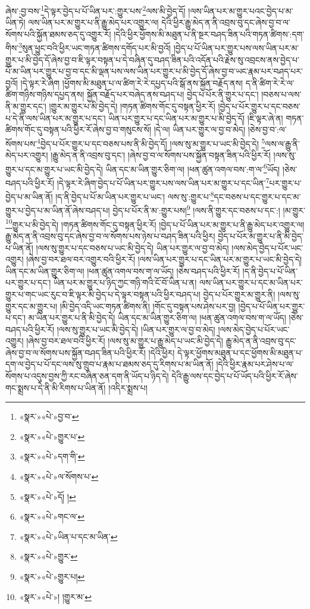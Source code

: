 ཞེས་:བྱ་བས་\footnote{«སྣར་»«པེ་»བྱ་བ་}དེ་ལྟར་བྱེད་པ་པོ་ཡིན་པར་:གྱུར་པས་\footnote{«སྣར་»«པེ་»གྱུར་པ་}ལས་མི་བྱེད་དོ། །ལས་ཡིན་པར་མ་གྱུར་པའང་བྱེད་པ་མ་ཡིན་ཏེ། ལས་ཡིན་པར་མ་གྱུར་པ་ནི་རྒྱུ་མེད་པར་འགྱུར་ལ། དེའི་ཕྱིར་རྒྱུ་མེད་ན་ནི་འབྲས་བུ་དང་ཞེས་བྱ་བ་ལ་སོགས་པའི་སྐྱོན་ཐམས་ཅད་དུ་འགྱུར་རོ། །དེའི་ཕྱིར་ཕྱོགས་མི་མཐུན་པ་ནི་སྔར་བཤད་ཟིན་པའི་གཏན་ཚིགས་:དག་གིས་\footnote{«སྣར་»«པེ་»དག་གི་}སུན་ཕྱུང་བའི་ཕྱིར་ཡང་གཏན་ཚིགས་དགོད་པར་མི་བྱའོ། །བྱེད་པ་པོ་ཡིན་པར་གྱུར་པས་ལས་ཡིན་པར་མ་གྱུར་པ་མི་བྱེད་དོ་ཞེས་བྱ་བ་ཇི་ལྟར་བསྟན་པ་དེ་བཞིན་དུ་བཤད་ཟིན་པའི་འདོན་པའི་རྗེས་སུ་འབྲངས་ནས་བྱེད་པ་པོ་མ་ཡིན་པར་གྱུར་པ་བྱ་བ་དང་མི་ལྡན་པས་ལས་ཡིན་པར་གྱུར་པ་མི་བྱེད་དོ་ཞེས་བྱ་བ་ཡང་རྣམ་པར་བཤད་པར་བྱའོ། །དེ་ལྟར་རེ་ཞིག །ཕྱོགས་མི་མཐུན་པ་ལ་ཚིག་རེ་རེ་དཔྱད་པའི་སྒོ་ནས་སྐྱོན་བརྗོད་ནས། ད་ནི་ཚིག་རེ་རེ་ལ་ཚིག་གཉིས་གཉིས་དཔྱད་ནས། སྐྱོན་བརྗོད་པར་བཞེད་ནས་བཤད་པ། བྱེད་པ་པོར་ནི་གྱུར་པ་དང་། །བཅས་པ་ལས་ནི་མ་གྱུར་དང་། །གྱུར་མ་གྱུར་པ་མི་བྱེད་དེ། །གཏན་ཚིགས་གོང་དུ་བསྟན་ཕྱིར་རོ། །བྱེད་པ་པོར་གྱུར་པ་དང་བཅས་པ་དེ་ནི་ལས་ཡིན་པར་མ་གྱུར་པ་དང་། ཡིན་པར་གྱུར་པ་དང་ཡིན་པར་མ་གྱུར་པ་མི་བྱེད་དོ། །ཇི་ལྟར་ཞེ་ན། གཏན་ཚིགས་གོང་དུ་བསྟན་པའི་ཕྱིར་རོ་ཞེས་བྱ་བ་གསུངས་སོ། །དེ་ལ། ཡིན་པར་གྱུར་ལ་བྱ་བ་མེད། །ཅེས་བྱ་བ་:ལ་སོགས་པས་\footnote{«སྣར་»«པེ་»ལ་སོགས་པ་}བྱེད་པ་པོར་གྱུར་པ་དང་བཅས་པས་ནི་མི་བྱེད་དོ། །ལས་སུ་མ་གྱུར་པ་ཡང་མི་བྱེད་དེ། \footnote{«སྣར་»«པེ་»དོ། ། }ལས་ལ་རྒྱུ་ནི་མེད་པར་འགྱུར། །རྒྱུ་མེད་ན་ནི་འབྲས་བུ་དང་། །ཞེས་བྱ་བ་ལ་སོགས་པས་སྐྱོན་བསྟན་ཟིན་པའི་ཕྱིར་རོ། །ལས་སུ་གྱུར་པ་དང་མ་གྱུར་པ་ཡང་མི་བྱེད་དེ། ཡིན་དང་མ་ཡིན་གྱུར་ཅིག་ལ། །ཕན་ཚུན་འགལ་བས་:ག་ལ་\footnote{«སྣར་»«པེ་»གང་ལ་}ཡོད། །ཅེས་བཤད་པའི་ཕྱིར་རོ། །དེ་ལྟར་རེ་ཞིག་བྱེད་པ་པོ་ཡིན་པར་གྱུར་པས་ལས་ཡིན་པར་མ་གྱུར་པ་དང་ཡིན་\footnote{«སྣར་»«པེ་»ཡིན་པ་དང་མ་ཡིན་}པར་གྱུར་པ་བྱེད་པ་མ་ཡིན་ནོ། །ད་ནི་བྱེད་པ་པོ་མ་ཡིན་པར་གྱུར་པ་ཡང་། ལས་སུ་:གྱུར་པ་\footnote{«སྣར་»«པེ་»གྱུར་}དང་བཅས་པ་དང་གྱུར་པ་དང་མ་གྱུར་པ་བྱེད་པ་མ་ཡིན་ནོ་ཞེས་བཤད་པ། བྱེད་པ་པོར་ནི་མ་:གྱུར་པས།\footnote{«སྣར་»«པེ་»གྱུར་པ།} །ལས་ནི་གྱུར་དང་བཅས་པ་དང་:། །མ་གྱུར་\footnote{«སྣར་»«པེ་»། །གྱུར་མ་}གྱུར་པ་མི་བྱེད་དེ། །གཏན་ཚིགས་གོང་དུ་བསྟན་ཕྱིར་རོ། །བྱེད་པ་པོ་ཡིན་པར་མ་གྱུར་པ་ནི་རྒྱུ་མེད་པར་འགྱུར་ལ། རྒྱུ་མེད་ན་ནི་འབྲས་བུ་དང་ཞེས་བྱ་བ་ལ་སོགས་པས་ཉེས་པ་བཤད་ཟིན་པའི་ཕྱིར། བྱེད་པ་པོར་མ་གྱུར་པ་ནི་མི་བྱེད་པ་ཡིན་ནོ། །ལས་སུ་གྱུར་པ་དང་བཅས་པ་ཡང་མི་བྱེད་དེ། ཡིན་པར་གྱུར་ལ་བྱ་བ་མེད། །ལས་མེད་བྱེད་པ་པོར་ཡང་འགྱུར། །ཞེས་བྱ་བར་ཐལ་བར་འགྱུར་བའི་ཕྱིར་རོ། །ལས་ཡིན་པར་གྱུར་པ་དང་ཡིན་པར་མ་གྱུར་པ་ཡང་མི་བྱེད་དེ། ཡིན་དང་མ་ཡིན་གྱུར་ཅིག་ལ། །ཕན་ཚུན་འགལ་བས་ག་ལ་ཡོད། །ཅེས་བཤད་པའི་ཕྱིར་རོ། །ད་ནི་བྱེད་པ་པོ་ཡིན་པར་གྱུར་པ་དང་། ཡིན་པར་མ་གྱུར་པ་ཉིད་ཀྱང་གཉི་གའི་ངོ་བོ་ཡིན་པ་ན། ལས་ཡིན་པར་གྱུར་པ་དང་མ་ཡིན་པར་གྱུར་པ་གང་ཡང་རུང་བ་ཇི་ལྟར་མི་བྱེད་པ་དེ་ལྟར་བསྟན་པའི་ཕྱིར་བཤད་པ། བྱེད་པ་པོར་གྱུར་མ་གྱུར་ནི། །ལས་སུ་གྱུར་དང་མ་གྱུར་པ། །མི་བྱེད་འདི་ཡང་གཏན་ཚིགས་ནི། །གོང་དུ་བསྟན་པས་ཤེས་པར་བྱ། །བྱེད་པ་པོ་ཡིན་པར་གྱུར་པ་དང་། མ་ཡིན་པར་གྱུར་པ་ནི་མི་བྱེད་དེ། ཡིན་དང་མ་ཡིན་གྱུར་ཅིག་ལ། །ཕན་ཚུན་འགལ་བས་ག་ལ་ཡོད། །ཅེས་བཤད་པའི་ཕྱིར་རོ། །ལས་སུ་གྱུར་པ་ཡང་མི་བྱེད་དེ། །ཡིན་པར་གྱུར་ལ་བྱ་བ་མེད། །ལས་མེད་བྱེད་པ་པོར་ཡང་འགྱུར། །ཞེས་བྱ་བར་ཐལ་བའི་ཕྱིར་རོ། །ལས་སུ་མ་གྱུར་པ་རྒྱུ་མེད་པ་ཡང་མི་བྱེད་དེ། རྒྱུ་མེད་ན་ནི་འབྲས་བུ་དང་ཞེས་བྱ་བ་ལ་སོགས་པས་སྐྱོན་བཤད་ཟིན་པའི་ཕྱིར་རོ། །དེའི་ཕྱིར། དེ་ལྟར་ཕྱོགས་མཐུན་པ་དང་ཕྱོགས་མི་མཐུན་པ་དག་ལ་བྱེད་པ་པོ་དང་ལས་སུ་གྲུབ་པ་རྣམ་པ་ཐམས་ཅད་དུ་རིགས་པ་མ་ཡིན་ནོ། །དེའི་ཕྱིར་རྣམ་པར་ཤེས་པ་ལ་སོགས་པ་འདུས་བྱས་ཀྱི་རང་བཞིན་ཅན་དག་ནི་ཡོད་པ་ཉིད་དེ། དེའི་རྒྱུ་ལས་དང་བྱེད་པ་པོ་ཡོད་པའི་ཕྱིར་རོ་ཞེས་གང་སྨྲས་པ་དེ་ནི་མི་རིགས་པ་ཡིན་ནོ། །འདིར་སྨྲས་པ། 